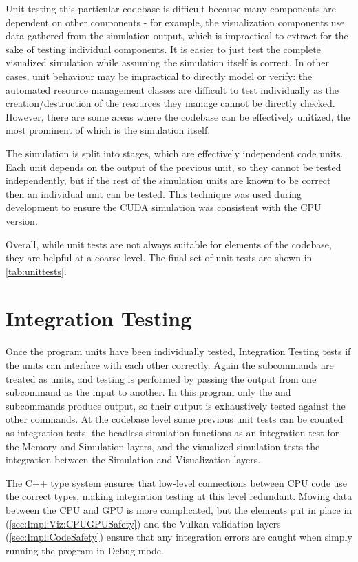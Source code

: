 Unit-testing this particular codebase is difficult because many components are dependent on other components - for example, the visualization components use data gathered from the simulation output, which is impractical to extract for the sake of testing individual components.
It is easier to just test the complete visualized simulation while assuming the simulation itself is correct.
In other cases, unit behaviour may be impractical to directly model or verify: the automated resource management classes are difficult to test individually as the creation/destruction of the resources they manage cannot be directly checked.
However, there are some areas where the codebase can be effectively unitized, the most prominent of which is the simulation itself.

The simulation is split into stages, which are effectively independent code units.
Each unit depends on the output of the previous unit, so they cannot be tested independently, but if the rest of the simulation units are known to be correct then an individual unit can be tested.
This technique was used during development to ensure the CUDA simulation was consistent with the CPU version.

Overall, while unit tests are not always suitable for elements of the codebase, they are helpful at a coarse level.
The final set of unit tests are shown in \cref{tab:unittests}.

\section{Integration Testing}
Once the program units have been individually tested, Integration Testing tests if the units can interface with each other correctly.
Again the subcommands are treated as units, and testing is performed by passing the output from one subcommand as the input to another.
In this program only the  and  subcommands produce output, so their output is exhaustively tested against the other commands.
At the codebase level some previous unit tests can be counted as integration tests:
the headless simulation functions as an integration test for the Memory and Simulation layers, and the visualized simulation tests the integration between the Simulation and Visualization layers.

The C++ type system ensures that low-level connections between CPU code use the correct types, making integration testing at this level redundant.
Moving data between the CPU and GPU is more complicated, but the elements put in place in (\cref{sec:Impl:Viz:CPUGPUSafety}) and the Vulkan validation layers (\cref{sec:Impl:CodeSafety}) ensure that any integration errors are caught when simply running the program in Debug mode.

